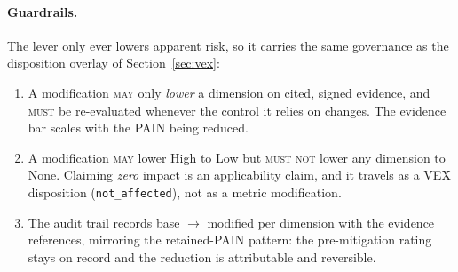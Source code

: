 \documentclass[11pt]{article}
\newcommand{\code}[1]{\texttt{#1}}
\newcommand{\rfckw}[1]{\textsc{#1}}
\begin{document}
\paragraph{Guardrails.} The lever only ever lowers apparent risk, so it carries the
same governance as the disposition overlay of Section~\ref{sec:vex}:
\begin{enumerate}[leftmargin=1.7em,nosep,topsep=3pt]
\item A modification \rfckw{may} only \emph{lower} a dimension on cited, signed
  evidence, and \rfckw{must} be re-evaluated whenever the control it relies on
  changes. The evidence bar scales with the PAIN being reduced.
\item A modification \rfckw{may} lower High to Low but \rfckw{must not} lower any
  dimension to None. Claiming \emph{zero} impact is an applicability claim, and it
  travels as a VEX disposition (\code{not\_affected}), not as a metric modification.
\item The audit trail records base $\rightarrow$ modified per dimension with the
  evidence references, mirroring the retained-PAIN pattern: the pre-mitigation
  rating stays on record and the reduction is attributable and reversible.
\end{enumerate}
\end{document}
